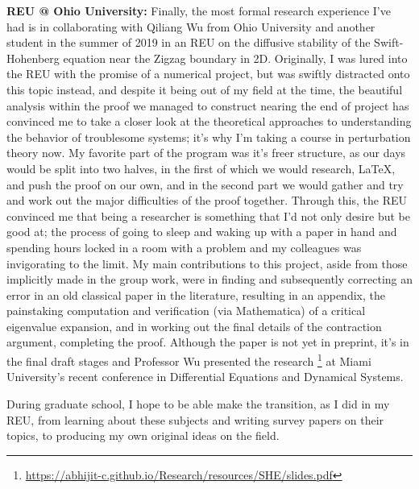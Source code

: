 \documentclass[11pt]{article}
\begin{document}
{\bf REU @ Ohio University:} Finally, the most formal research experience I've
had is in collaborating with Qiliang Wu from Ohio University and another student
in the summer of 2019 in an REU on the diffusive stability of the
Swift-Hohenberg equation near the Zigzag boundary in 2D. Originally, I was lured
into the REU with the promise of a numerical project, but was swiftly distracted
onto this topic instead, and despite it being out of my field at the time, the
beautiful analysis within the proof we managed to construct nearing the end of
project has convinced me to take a closer look at the theoretical approaches to
understanding the behavior of troublesome systems; it's why I'm taking a course
in perturbation theory now.  My favorite part of the program was it's freer
structure, as our days would be split into two halves, in the first of which we
would research, \LaTeX, and push the proof on our own, and in the second part we
would gather and try and work out the major difficulties of the proof together.
Through this, the REU convinced me that being a researcher is something that I'd
not only desire but be good at; the process of going to sleep and waking up with
a paper in hand and spending hours locked in a room with a problem and my
colleagues was invigorating to the limit. My main contributions to this project,
aside from those implicitly made in the group work, were in finding and
subsequently correcting an error in an old classical paper in the literature,
resulting in an appendix, the painstaking computation and verification (via
Mathematica) of a critical eigenvalue expansion, and in working out the final
details of the contraction argument, completing the proof.
Although the paper is not yet in preprint, it's in the final draft stages and
Professor Wu presented the research%
\footnote{\url{https://abhijit-c.github.io/Research/resources/SHE/slides.pdf}}
at Miami University's recent conference in Differential Equations and Dynamical
Systems.

During graduate school, I hope to be able make the transition, as I did in my
REU, from learning about these subjects and writing survey papers on their
topics, to producing my own original ideas on the field. 
\end{document}
